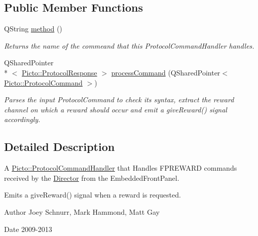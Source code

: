 \subsection*{Public Member Functions}
\begin{DoxyCompactItemize}
\item 
\hypertarget{struct_f_p_r_e_w_a_r_d_command_handler_abb574c7e2cd80277f9a0311f67f81538}{Q\-String \hyperlink{struct_f_p_r_e_w_a_r_d_command_handler_abb574c7e2cd80277f9a0311f67f81538}{method} ()}\label{struct_f_p_r_e_w_a_r_d_command_handler_abb574c7e2cd80277f9a0311f67f81538}

\begin{DoxyCompactList}\small\item\em Returns the name of the commeand that this Protocol\-Command\-Handler handles. \end{DoxyCompactList}\item 
\hypertarget{struct_f_p_r_e_w_a_r_d_command_handler_a7c5710ad858e5fba0c2e23b5f72b7ebb}{Q\-Shared\-Pointer\\*
$<$ \hyperlink{struct_picto_1_1_protocol_response}{Picto\-::\-Protocol\-Response} $>$ \hyperlink{struct_f_p_r_e_w_a_r_d_command_handler_a7c5710ad858e5fba0c2e23b5f72b7ebb}{process\-Command} (Q\-Shared\-Pointer$<$ \hyperlink{struct_picto_1_1_protocol_command}{Picto\-::\-Protocol\-Command} $>$)}\label{struct_f_p_r_e_w_a_r_d_command_handler_a7c5710ad858e5fba0c2e23b5f72b7ebb}

\begin{DoxyCompactList}\small\item\em Parses the input Protocol\-Command to check its syntax, extract the reward channel on which a reward should occur and emit a give\-Reward() signal accordingly. \end{DoxyCompactList}\end{DoxyCompactItemize}


\subsection{Detailed Description}
A \hyperlink{struct_picto_1_1_protocol_command_handler}{Picto\-::\-Protocol\-Command\-Handler} that Handles F\-P\-R\-E\-W\-A\-R\-D commands received by the \hyperlink{class_director}{Director} from the Embedded\-Front\-Panel. 

Emits a give\-Reward() signal when a reward is requested. \begin{DoxyAuthor}{Author}
Joey Schnurr, Mark Hammond, Matt Gay 
\end{DoxyAuthor}
\begin{DoxyDate}{Date}
2009-\/2013 
\end{DoxyDate}


